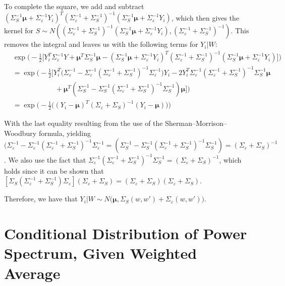 \documentclass[11pt]{article}
\begin{document}
To complete the square, we add and subtract $(\Sigma_S^{-1} \boldsymbol{\mu} 
+ \Sigma_\varepsilon^{-1} Y_i)^T(\Sigma_\varepsilon^{-1}+\Sigma_S^{-1})^{-1}
(\Sigma_S^{-1} \boldsymbol{\mu} + \Sigma_\varepsilon^{-1} Y_i)$, 
which then gives the kernel for $S \sim N\left((\Sigma_\varepsilon^{-1}
+\Sigma_S^{-1})^{-1}(\Sigma_S^{-1} \boldsymbol{\mu} + \Sigma_\varepsilon^{-1} Y_i), 
(\Sigma_\varepsilon^{-1}+\Sigma_S^{-1})^{-1} \right)$. 
This removes the integral and leaves us with the following terms for $Y_i|W$:
$$
\begin{aligned}
&\exp\Big(-\frac{1}{2}\big[Y_i^T\Sigma_\varepsilon^{-1} Y + 
\boldsymbol{\mu}^T\Sigma_S^{-1} \boldsymbol{\mu} - (\Sigma_S^{-1} \boldsymbol{\mu} + 
\Sigma_\varepsilon^{-1} Y_i)^T(\Sigma_\varepsilon^{-1}+\Sigma_S^{-1})^{-1} 
(\Sigma_S^{-1} \boldsymbol{\mu} + \Sigma_\varepsilon^{-1} Y_i)\big]\Big) \\
&= \exp\Big(-\frac{1}{2}\big[Y_i^T\big(\Sigma_\varepsilon^{-1} - 
\Sigma_\varepsilon^{-1}(\Sigma_\varepsilon^{-1}+\Sigma_S^{-1})^{-1}\Sigma_\varepsilon^{-1}\big)Y_i 
-2Y_i^T \Sigma_\varepsilon^{-1}(\Sigma_\varepsilon^{-1}+\Sigma_S^{-1})^{-1}\Sigma_S^{-1} \boldsymbol{\mu} \\
&\qquad \qquad \qquad + \boldsymbol{\mu}^T (\Sigma_S^{-1} - \Sigma_S^{-1}(\Sigma_\varepsilon^{-1}
+\Sigma_S^{-1})^{-1}\Sigma_S^{-1}) \boldsymbol{\mu}\big]\Big) \\
&= \exp\Big(-\frac{1}{2}\big((Y_i-\boldsymbol{\mu})^T(\Sigma_\varepsilon+\Sigma_S)^{-1}
(Y_i-\boldsymbol{\mu}) \big)\Big)
\end{aligned}
$$

With the last equality resulting from the use of the Sherman–Morrison–Woodbury formula, 
yielding $\big(\Sigma_\varepsilon^{-1} - \Sigma_\varepsilon^{-1}(\Sigma_\varepsilon^{-1}+
\Sigma_S^{-1})^{-1}\Sigma_\varepsilon^{-1} = (\Sigma_S^{-1} - \Sigma_S^{-1}
(\Sigma_\varepsilon^{-1}+\Sigma_S^{-1})^{-1}\Sigma_S^{-1}) = (\Sigma_\varepsilon+\Sigma_S)^{-1}$. 
We also use the fact that $\Sigma_\varepsilon^{-1}(\Sigma_\varepsilon^{-1}+
\Sigma_S^{-1})^{-1}\Sigma_S^{-1} = (\Sigma_\varepsilon + \Sigma_S)^{-1}$, 
which holds since it can be shown that 
$[\Sigma_S(\Sigma_\varepsilon^{-1}+\Sigma_S^{-1})\Sigma_\varepsilon](\Sigma_\varepsilon+\Sigma_S)
=(\Sigma_\varepsilon+\Sigma_S)(\Sigma_\varepsilon+\Sigma_S)$.

Therefore, we have that $Y_i|W \sim N\big(\boldsymbol{\mu}, \Sigma_S(w,w')+\Sigma_\varepsilon(w,w')\big)$.

\section{Conditional Distribution of Power Spectrum, Given Weighted Average}
\label{sec:apdx_SgivenY}
\end{document}
